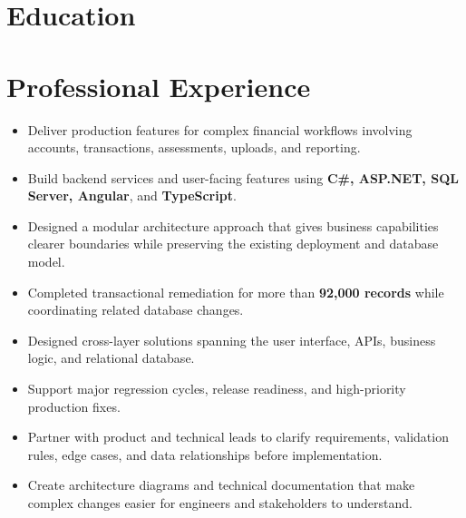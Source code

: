 \documentclass[10pt,a4paper]{moderncv}
\begin{document}
\makecvtitle
\vspace{-1.4em}
\section{Education}
\section{Professional Experience}
\begin{itemize}
\item Deliver production features for complex financial workflows involving accounts, transactions, assessments, uploads, and reporting.
\item Build backend services and user-facing features using \textbf{C\#, ASP.NET, SQL Server, Angular}, and \textbf{TypeScript}.
\item Designed a modular architecture approach that gives business capabilities clearer boundaries while preserving the existing deployment and database model.
\item Completed transactional remediation for more than \textbf{92,000 records} while coordinating related database changes.
\item Designed cross-layer solutions spanning the user interface, APIs, business logic, and relational database.
\item Support major regression cycles, release readiness, and high-priority production fixes.
\item Partner with product and technical leads to clarify requirements, validation rules, edge cases, and data relationships before implementation.
\item Create architecture diagrams and technical documentation that make complex changes easier for engineers and stakeholders to understand.
\end{itemize}
\end{document}
